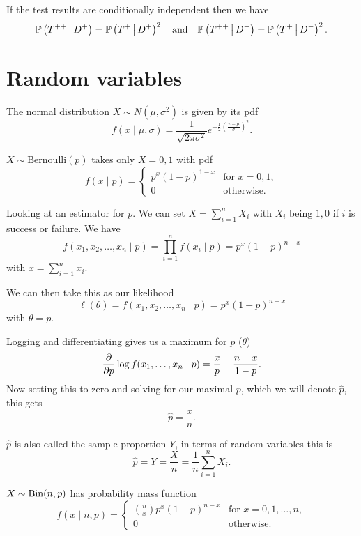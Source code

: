 \documentclass[10pt, a4paper]{article}
\begin{document}
If the test results are conditionally independent then we have
\[
\mathbb{P}\left(T ^ {++} \,\middle|\, D ^ {+}\right) = \mathbb{P}\left(T ^ {+} \,\middle|\, D ^ {+}\right) ^ 2\quad\text{and}\quad\mathbb{P}\left(T ^ {++} \,\middle|\, D ^ {-}\right) = \mathbb{P}\left(T ^ {+} \,\middle|\, D ^ {-}\right) ^ 2.
\]

\newpage

\section{Random variables}
The normal distribution $X \sim N(\mu, \sigma ^ 2)$ is given by its pdf
\[
f(x\mid \mu, \sigma) = \frac{1}{\sqrt{2\pi\sigma ^ 2}}e ^ {-\frac{1}{2}\left(\frac{x - \mu}{\sigma}\right) ^ 2}.
\]

\begin{definition}
    $X \sim \mathrm{Bernoulli}(p)$ takes only $X = 0, 1$ with pdf
    \[
    f(x\mid p) = \begin{cases}
        p ^ x(1 - p) ^ {1 - x} &\text{for } x = 0, 1, \\
        0 & \text{otherwise}.
    \end{cases}
    \]
\end{definition}

Looking at an estimator for $p$.
We can set $X = \sum_{i = 1}^{n}X_i$ with $X_i$ being $1, 0$ if $i$ is success or failure.
We have
\[
f(x_1, x_2, \dotsc, x_n\mid p) = \prod_{i = 1}^{n}f(x_i\mid p) = p ^ x(1 - p) ^ {n - x}
\]
with $x = \sum_{i = 1}^{n}x_i$.

We can then take this as our likelihood
\[
\ell(\theta) = f(x_1, x_2, \dotsc, x_n\mid p) = p ^ x(1 - p) ^ {n - x}
\]
with $\theta = p$.

Logging and differentiating gives us a maximum for $p$
($\theta$)
\[
\frac{\partial }{\partial p}\log{f(x_1, \dotsc, x_n\mid p)} = \frac{x}{p} - \frac{n - x}{1 - p}.
\]
Now setting this to zero and solving for our maximal $p$,
which we will denote $\hat{p}$,
this gets
\[
\hat{p} = \frac{x}{n}.
\]

$\hat{p}$ is also called the sample proportion $Y$,
in terms of random variables this is
\[
\hat{p} = Y = \frac{X}{n} = \frac{1}{n}\sum_{i = 1}^{n}X_i.
\]

\begin{definition}
    $X \sim \operatorname{Bin}(n, p)$ has probability mass function
    \[
    f(x\mid n, p) = \begin{cases}
        \binom{n}{x}p ^ x(1 - p) ^ {n - x} &\text{for } x = 0, 1, \dotsc, n, \\
        0 &\text{otherwise}.
    \end{cases}
    \]
\end{definition}
\end{document}
